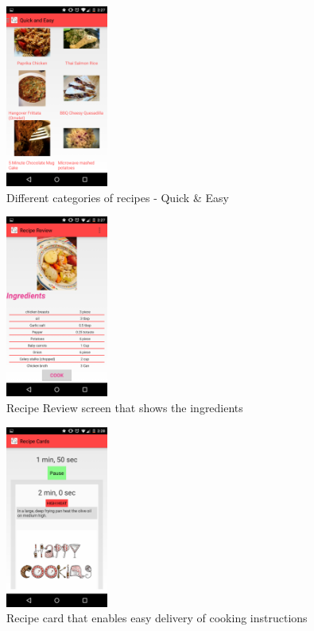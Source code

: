 \begin{figure}[ht!]
	\centering
	\includegraphics[width=0.3\textwidth, height=0.3\textheight]{images/quick_easy.png}
	\caption{Different categories of recipes - Quick \& Easy\label{fig_5}}
\end{figure}


\begin{figure}[ht!]
	\centering
	\includegraphics[width=0.3\textwidth, height=0.3\textheight]{images/recipe_review.png}
	\caption{Recipe Review screen that shows the ingredients \label{recipe-review}}
\end{figure}


\begin{figure}[ht!]
	\centering
	\includegraphics[width=0.3\textwidth, height=0.3\textheight]{images/recipe_cards_1.png}
	\caption{Recipe card that enables easy delivery of cooking instructions \label{recipe-card1}}
\end{figure}

